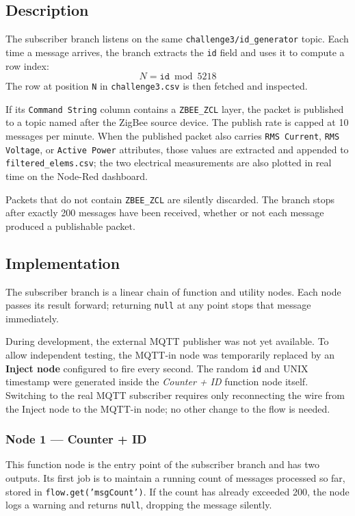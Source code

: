 \documentclass[a4paper,11pt]{article}
\begin{document}
\subsection{Description}

The subscriber branch listens on the same \texttt{challenge3/id\_generator} topic. Each time a message arrives, the branch extracts the \texttt{id} field and uses it to compute a row index:
\[
    N = \texttt{id} \bmod 5218
\]
The row at position \texttt{N} in \texttt{challenge3.csv} is then fetched and inspected.

If its \texttt{Command String} column contains a \texttt{ZBEE\_ZCL} layer, the packet is published to a topic named after the ZigBee source device. The publish rate is capped at 10 messages per minute. When the published packet also carries \texttt{RMS Current}, \texttt{RMS Voltage}, or \texttt{Active Power} attributes, those values are extracted and appended to \texttt{filtered\_elems.csv}; the two electrical measurements are also plotted in real time on the Node-Red dashboard.

Packets that do not contain \texttt{ZBEE\_ZCL} are silently discarded. The branch stops after exactly 200 messages have been received, whether or not each message produced a publishable packet.

\subsection{Implementation}

The subscriber branch is a linear chain of function and utility nodes. Each node passes its result forward; returning \texttt{null} at any point stops that message immediately.

During development, the external MQTT publisher was not yet available. To allow independent testing, the MQTT-in node was temporarily replaced by an \textbf{Inject node} configured to fire every second. The random \texttt{id} and UNIX timestamp were generated inside the \textit{Counter + ID} function node itself. Switching to the real MQTT subscriber requires only reconnecting the wire from the Inject node to the MQTT-in node; no other change to the flow is needed.

\subsubsection*{Node 1 — Counter + ID}

This function node is the entry point of the subscriber branch and has two outputs. Its first job is to maintain a running count of messages processed so far, stored in \texttt{flow.get('msgCount')}. If the count has already exceeded 200, the node logs a warning and returns \texttt{null}, dropping the message silently.
\end{document}
